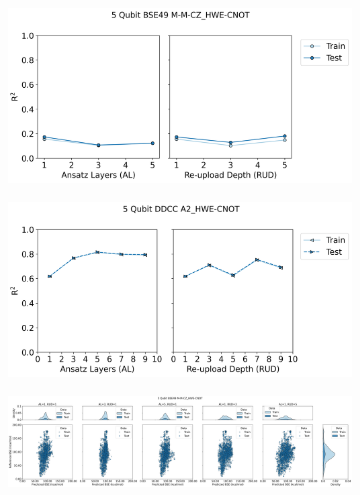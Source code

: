 \documentclass[journal=jacsat,manuscript=article]{achemso}
\begin{document}
\begin{figure}[H]
	\centering	
	\begin{subfigure}[b]{0.49\textwidth}
		\centering
		\includegraphics[width=\linewidth]{../images/BSE/fivequbit/BSE5_RUDAL_lineplot}
		\caption{}
		\label{fig:bse5RUDAL_lineplot}
	\end{subfigure}
	\hfill
	\begin{subfigure}[b]{0.49\textwidth}
		\centering
		\includegraphics[width=\linewidth]{../images/DDCC/DDCC_RUDAL_lineplot}
		\caption{}
		\label{fig:ddccRUDAL_lineplot}
	\end{subfigure}
	\hfill	
	\begin{subfigure}[b]{0.65\textwidth}
		\centering
		\includegraphics[width=\linewidth]{../images/BSE/fivequbit/distribution_parity}
		\caption{}
		\label{fig:BSE5_distribution_parity}
	\end{subfigure}
	\hfill


\end{figure}
\end{document}
